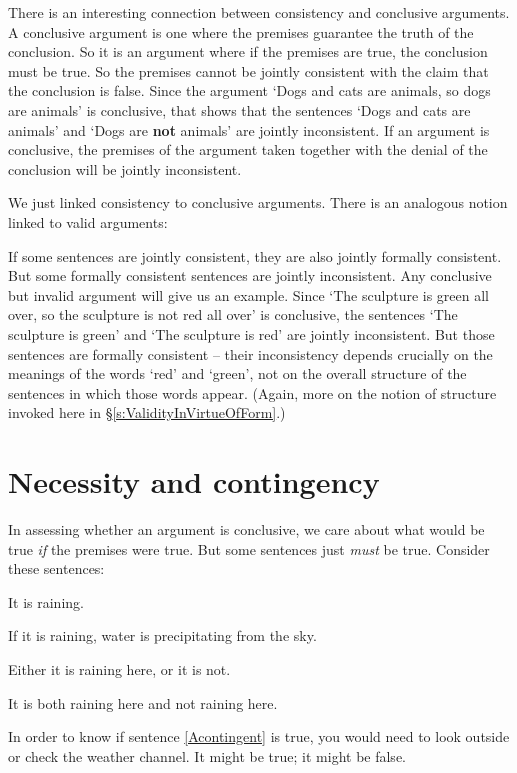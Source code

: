 There is an interesting connection between consistency and conclusive arguments. A conclusive argument is one where the premises guarantee the truth of the conclusion. So it is an argument where if the premises are true, the conclusion must be true. So the premises cannot be jointly consistent with the claim that the conclusion is false. Since the argument `Dogs and cats are animals, so dogs are animals' is conclusive, that shows that the sentences `Dogs and cats are animals' and `Dogs are \textbf{not} animals' are jointly inconsistent. If an argument is conclusive, the premises of the argument taken together with the denial of the conclusion will be jointly inconsistent.

We just linked consistency to conclusive arguments. There is an analogous notion linked to valid arguments: 

If some sentences are jointly consistent, they are also jointly formally consistent. But some formally consistent sentences are jointly inconsistent. Any conclusive but invalid argument will give us an example. Since `The sculpture is green all over, so the sculpture is not red all over' is conclusive, the sentences `The sculpture is green' and `The sculpture is red' are jointly inconsistent. But those sentences are formally consistent – their inconsistency depends crucially on the meanings of the words `red' and `green', not on the overall structure of the sentences in which those words appear. (Again, more on the notion of structure invoked here in §\ref{s:ValidityInVirtueOfForm}.)

\section{Necessity and contingency}\label{s:neccandcont}
In assessing whether an argument is conclusive, we care about what would be true \emph{if} the premises were true. But some sentences just \emph{must} be true. Consider these sentences:
	\begin{earg}
		\item[\ex{Acontingent}] It is raining.
		\item[\ex{Anecessity}] If it is raining, water is precipitating from the sky.
		\item[\ex{Atautology}] Either it is raining here, or it is not.
		\item[\ex{Acontradiction}] It is both raining here and not raining here.
	\end{earg}
In order to know if sentence \ref{Acontingent} is true, you would need to look outside or check the weather channel. It might be true; it might be false.

